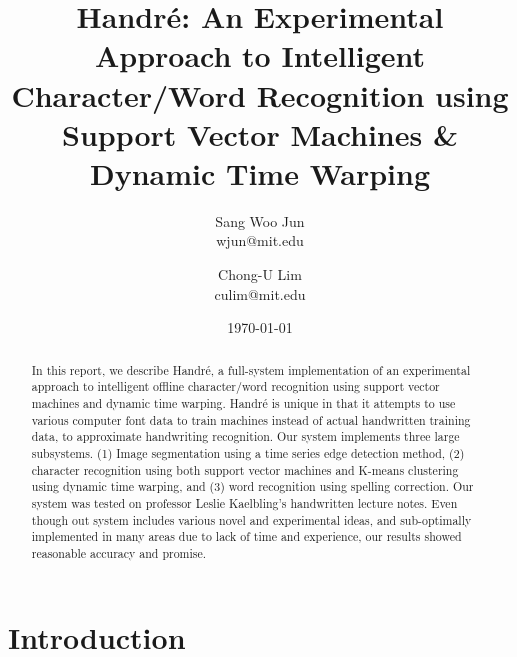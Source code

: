 \documentclass[12pt]{article}
\title{Handr\'{e}: An Experimental Approach to Intelligent Character/Word Recognition using Support Vector Machines \& Dynamic Time Warping}
\date{\today}
\author{
	Sang Woo Jun \\ 
	wjun@mit.edu \\ 
  \and
  Chong-U Lim\\
  culim@mit.edu
}
\begin{document}
\maketitle

\begin{abstract}

	In this report, we describe Handr\'{e}, a full-system implementation of an experimental approach to intelligent offline character/word recognition using support vector machines and dynamic time warping. Handr\'{e} is unique in that it attempts to use various computer font data to train machines instead of actual handwritten training data, to approximate handwriting recognition. Our system implements three large subsystems. (1) Image segmentation using a time series edge detection method, (2) character recognition using both support vector machines and K-means clustering using dynamic time warping, and (3) word recognition using spelling correction. Our system was tested on professor Leslie Kaelbling's handwritten lecture notes. Even though out system includes various novel and experimental ideas, and sub-optimally implemented in many areas due to lack of time and experience, our results showed reasonable accuracy and promise.
	
\end{abstract}

\newpage
\tableofcontents
\newpage
\section{Introduction}
\end{document}
